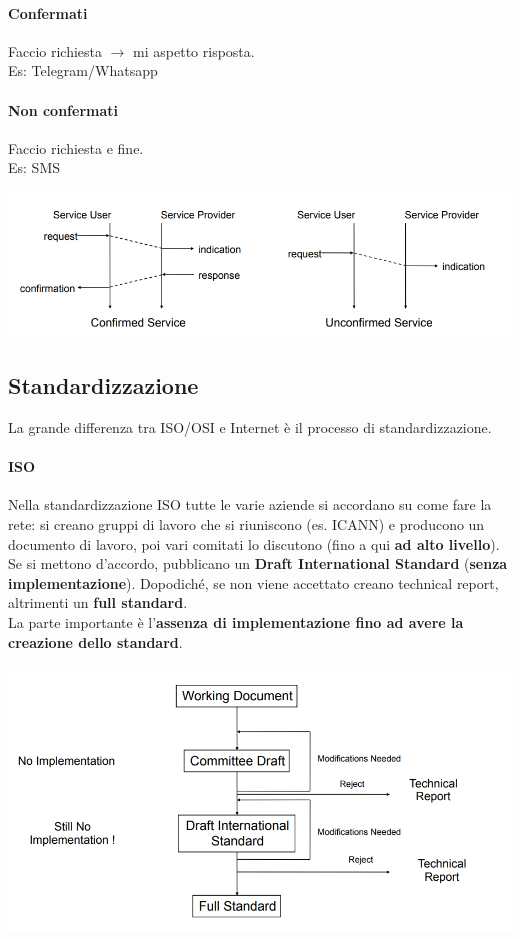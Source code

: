 \documentclass[10pt]{book}
\begin{document}
\paragraph{Confermati} Faccio richiesta $\rightarrow$ mi aspetto risposta.\\Es: Telegram/Whatsapp
\paragraph{Non confermati} Faccio richiesta e fine.\\Es: SMS
\begin{center}
	\includegraphics[scale=0.7]{timediag.png}
\end{center}
\subsection{Standardizzazione}
La grande differenza tra ISO/OSI e Internet è il processo di standardizzazione.
\pagebreak
\paragraph{ISO} Nella standardizzazione ISO tutte le varie aziende si accordano su come fare la rete: si creano gruppi di lavoro che si riuniscono (es. ICANN) e producono un documento di lavoro, poi vari comitati lo discutono (fino a qui \textbf{ad alto livello}).\\
Se si mettono d'accordo, pubblicano un \textbf{Draft International Standard} (\textbf{senza implementazione}). Dopodiché, se non viene accettato creano technical report, altrimenti un \textbf{full standard}.\\
La parte importante è l'\textbf{assenza di implementazione fino ad avere la creazione dello standard}.

\begin{center}
	\includegraphics[scale=0.7]{stdiso.png}
\end{center}
\end{document}
